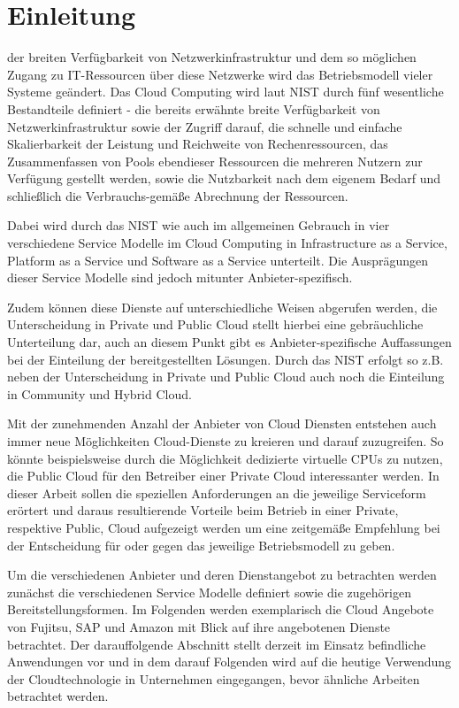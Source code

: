 \section{Einleitung}
\label{sec_introduction}

 der breiten Verfügbarkeit von Netzwerkinfrastruktur und dem so möglichen Zugang zu IT-Ressourcen über diese Netzwerke wird das Betriebsmodell vieler Systeme geändert. Das Cloud Computing wird laut NIST durch fünf wesentliche Bestandteile definiert - die bereits erwähnte breite Verfügbarkeit von Netzwerkinfrastruktur sowie der Zugriff darauf, die schnelle und einfache Skalierbarkeit der Leistung und Reichweite von Rechenressourcen, das Zusammenfassen von Pools ebendieser Ressourcen die mehreren Nutzern zur Verfügung gestellt werden, sowie die Nutzbarkeit nach dem eigenem Bedarf und schließlich die Verbrauchs-gemäße Abrechnung der Ressourcen.

Dabei wird durch das NIST wie auch im allgemeinen Gebrauch in vier verschiedene Service Modelle im Cloud Computing in Infrastructure as a Service, Platform as a Service und Software as a Service unterteilt. Die Ausprägungen dieser Service Modelle sind jedoch mitunter Anbieter-spezifisch.

Zudem können diese Dienste auf unterschiedliche Weisen abgerufen werden, die Unterscheidung in Private und Public Cloud stellt hierbei eine gebräuchliche Unterteilung dar, auch an diesem Punkt gibt es Anbieter-spezifische Auffassungen bei der Einteilung der bereitgestellten Lösungen. Durch das NIST erfolgt so z.B. neben der Unterscheidung in Private und Public Cloud auch noch die Einteilung in Community und Hybrid Cloud. \cite{nistStandards}

Mit der zunehmenden Anzahl der Anbieter von Cloud Diensten entstehen auch immer neue Möglichkeiten Cloud-Dienste zu kreieren und darauf zuzugreifen. So könnte beispielsweise durch die Möglichkeit dedizierte virtuelle CPUs zu nutzen, die Public Cloud für den Betreiber einer Private Cloud interessanter werden. In dieser Arbeit sollen die speziellen Anforderungen an die jeweilige Serviceform erörtert und daraus resultierende Vorteile beim Betrieb in einer Private, respektive Public, Cloud aufgezeigt werden um eine zeitgemäße Empfehlung bei der Entscheidung für oder gegen das jeweilige Betriebsmodell zu geben. 

Um die verschiedenen Anbieter und deren Dienstangebot zu betrachten werden zunächst die verschiedenen Service Modelle definiert sowie die zugehörigen Bereitstellungsformen. Im Folgenden werden exemplarisch die Cloud Angebote von Fujitsu, SAP und Amazon mit Blick auf ihre angebotenen Dienste betrachtet. Der darauffolgende Abschnitt stellt derzeit im Einsatz befindliche Anwendungen vor und in dem darauf Folgenden wird auf die heutige Verwendung der Cloudtechnologie in Unternehmen eingegangen, bevor ähnliche Arbeiten betrachtet werden.
